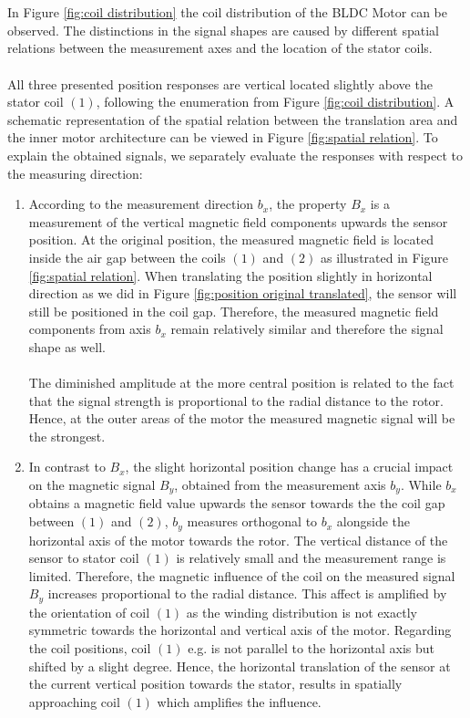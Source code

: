 \documentclass[english]{isasthesis}
\begin{document}
       		\\\\In Figure \ref{fig:coil distribution} the coil distribution of the BLDC Motor can be observed. The distinctions in the signal shapes are caused by different spatial relations between the measurement axes and the location of the stator coils. \\ \\
    		All three presented position responses are vertical located slightly above the stator coil $(1)$, following the enumeration from Figure \ref{fig:coil distribution}. A schematic representation of the spatial relation between the translation area and the inner motor architecture can be viewed in Figure \ref{fig:spatial relation}. To explain the obtained signals, we separately evaluate the responses with respect to the measuring direction:
    		\begin{enumerate}
    			\item According to the measurement direction $b_x$, the property $B_x$ is a measurement of the vertical magnetic field components upwards the sensor position. At the original position, the measured magnetic field is located inside the air gap between the coils $(1)$ and $(2)$ as illustrated in Figure \ref{fig:spatial relation}. When translating the position slightly in horizontal direction as we did in Figure \ref{fig:position original translated}, the sensor will still be positioned in the coil gap. Therefore, the measured magnetic field components from axis $b_x$ remain relatively similar and therefore the signal shape as well. \\ \\
    			The diminished amplitude at the more central position is related to the fact that the signal strength is proportional to the radial distance to the rotor. Hence, at the outer areas of the motor the measured magnetic signal will be the strongest.
    			\item In contrast to $B_x$, the slight horizontal position change has a crucial impact on the magnetic signal $B_y$, obtained from the measurement axis $b_y$. While $b_x$ obtains a magnetic field value upwards the sensor towards the the coil gap between $(1)$ and $(2)$, $b_y$ measures orthogonal to $b_x$ alongside the horizontal axis of the motor towards the rotor. The vertical distance of the sensor to stator coil $(1)$ is relatively small and the measurement range is limited. Therefore, the magnetic influence of the coil on the measured signal $B_y$ increases proportional to the radial distance. This affect is amplified by the orientation of coil $(1)$ as the winding distribution is not exactly symmetric towards the horizontal and vertical axis of the motor. Regarding the coil positions, coil $(1)$ e.g. is not parallel to the horizontal axis but shifted by a slight degree. Hence, the horizontal translation of the sensor at the current vertical position towards the stator, results in spatially approaching coil $(1)$ which amplifies the influence.
    		\end{enumerate}    		
\end{document}
